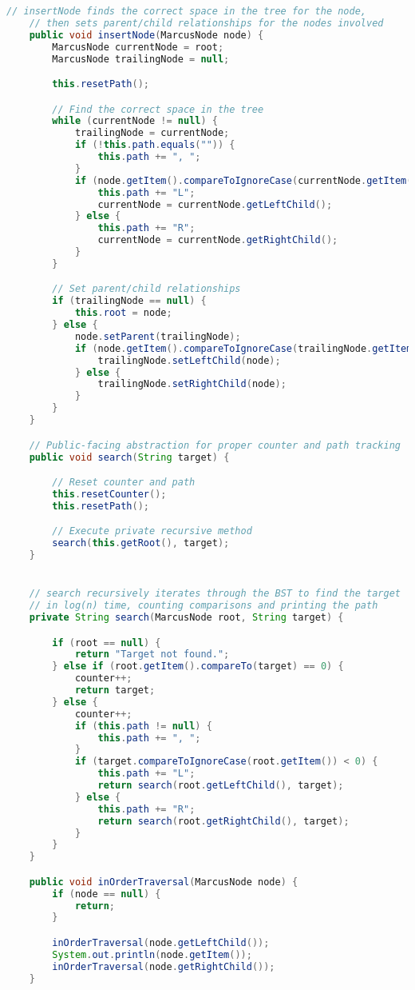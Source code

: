 \documentclass[letterpaper, 10pt]{article}
\begin{document}
\begin{lstlisting}[language=Java, firstnumber=22]
    // insertNode finds the correct space in the tree for the node,
    // then sets parent/child relationships for the nodes involved
    public void insertNode(MarcusNode node) {
        MarcusNode currentNode = root;
        MarcusNode trailingNode = null;

        this.resetPath();

        // Find the correct space in the tree
        while (currentNode != null) {
            trailingNode = currentNode;
            if (!this.path.equals("")) {
                this.path += ", ";
            }
            if (node.getItem().compareToIgnoreCase(currentNode.getItem()) < 0) {
                this.path += "L";
                currentNode = currentNode.getLeftChild();
            } else {
                this.path += "R";
                currentNode = currentNode.getRightChild();
            }
        }

        // Set parent/child relationships
        if (trailingNode == null) {
            this.root = node;
        } else {
            node.setParent(trailingNode);
            if (node.getItem().compareToIgnoreCase(trailingNode.getItem()) < 0) {
                trailingNode.setLeftChild(node);
            } else {
                trailingNode.setRightChild(node);
            }
        }
    }

    // Public-facing abstraction for proper counter and path tracking
    public void search(String target) {

        // Reset counter and path
        this.resetCounter();
        this.resetPath();

        // Execute private recursive method
        search(this.getRoot(), target);
    }


    // search recursively iterates through the BST to find the target
    // in log(n) time, counting comparisons and printing the path
    private String search(MarcusNode root, String target) {

        if (root == null) { 
            return "Target not found.";
        } else if (root.getItem().compareTo(target) == 0) {
            counter++;
            return target;
        } else {
            counter++;
            if (this.path != null) {
                this.path += ", ";
            }
            if (target.compareToIgnoreCase(root.getItem()) < 0) {
                this.path += "L";
                return search(root.getLeftChild(), target);
            } else {
                this.path += "R";
                return search(root.getRightChild(), target);
            }
        }
    }

    public void inOrderTraversal(MarcusNode node) {
        if (node == null) {
            return;
        }

        inOrderTraversal(node.getLeftChild());
        System.out.println(node.getItem());
        inOrderTraversal(node.getRightChild());
    }
\end{lstlisting}
\end{document}
